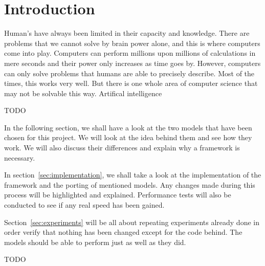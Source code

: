 \section{Introduction}
Human's have always been limited in their capacity and knowledge. There are problems that we cannot solve by brain power alone, and this is where computers come into play. Computers can perform millions upon millions of calculations in mere seconds and their power only increases as time goes by. However, computers can only solve problems that humans are able to precisely describe. Most of the times, this works very well. But there is one whole area of computer science that may not be solvable this way. Artifical intelligence

TODO

In the following section, we shall have a look at the two models that have been chosen for this project. We will look at the idea behind them and see how they work. We will also discuss their differences and explain why a framework is necessary.

In section~\ref{sec:implementation}, we shall take a look at the implementation of the framework and the porting of mentioned models. Any changes made during this process will be highlighted and explained. Performance tests will also be conducted to see if any real speed has been gained.

Section~\ref{sec:experiments} will be all about repeating experiments already done in order verify that nothing has been changed except for the code behind. The models should be able to perform just as well as they did.

TODO
